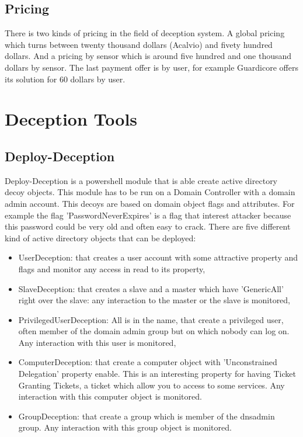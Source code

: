 \documentclass{tnreport}
\begin{document}
\subsection{Pricing}
There is two kinds of pricing in the field of deception system. A global pricing which turns between twenty thousand dollars (Acalvio) and fivety hundred dollars. And a pricing by sensor which is around five hundred and one thousand dollars by sensor. The last payment offer is by user, for example Guardicore offers its solution for 60 dollars by user.

\section{Deception Tools}

\subsection{Deploy-Deception \cite{lib20}}
Deploy-Deception is a powershell module that is able create active directory decoy objects. This module has to be run on a Domain Controller with a domain admin account. This decoys are based on domain object flags and attributes. For example the flag 'PasswordNeverExpires' is a flag that interest attacker because this password could be very old and often easy to crack. 
There are five different kind of active directory objects that can be deployed: 
\begin{itemize}
    \item UserDeception: that creates a user account with some attractive property and flags and monitor any access in read to its property,
    \item SlaveDeception: that creates a slave and a master which have 'GenericAll' right over the slave: any interaction to the master or the slave is monitored,
    \item PrivilegedUserDeception: All is in the name, that create a privileged user, often member of the domain admin group but on which nobody can log on. Any interaction with this user is monitored,
    \item ComputerDeception: that create a computer object with 'Unconstrained Delegation' property enable. This is an interesting property for having Ticket Granting Tickets, a ticket which allow you to access to some services. Any interaction with this computer object is monitored.
    \item GroupDeception: that create a group which is member of the dnsadmin group. Any interaction with this group object is monitored.
\end{itemize}
\end{document}
